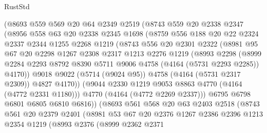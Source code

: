 \begin{lexlean}{RustStd}
\begin{coremodule}
          (@8693
            @559
            @569
            @20
            @64
            @2349
            @2519
            (@8743
              @559
              @20
              @2338
              @2347
              (@8956
                @558
                @63
                @20
                @2338
                @2345
                @1698
                (@8759
                  @556
                  @188
                  @20
                  @22
                  @2324
                  @2337
                  @2344
                  @1255
                  @2268
                  @1219
                  (@8743
                    @556
                    @20
                    @2301
                    @2322
                    (@8981
                      @95
                      @67
                      @20
                      @2298
                      @1267
                      @2308
                      @2317
                      @1213
                      @2276
                      @1219
                      (@8993
                        @2298
                        (@8999
                          @2284
                          @2293
                          @8792
                          @8390
                          @5711
                          @9006
                          @4758
                          (@4164 (@5731 @2293 @2285))
                          @4170))
                      @9018
                      @9022
                      (@5714 (@9024 @95))
                      @4758
                      (@4164 (@5731 @2317 @2309))
                      @4827
                      @4170))
                  (@9044 @2330 @1219 @9053 @8863 @4770 (@4164 (@4772 @2331 @1180)))
                  @4770
                  (@4164 (@4772 @2269 @2337)))
                @6795
                @6798
                @6801
                @6805
                @6810
                @6816))
            (@8693
              @561
              @568
              @20
              @63
              @2403
              @2518
              (@8743
                @561
                @20
                @2379
                @2401
                (@8981
                  @53
                  @67
                  @20
                  @2376
                  @1267
                  @2386
                  @2396
                  @1213
                  @2354
                  @1219
                  (@8993
                    @2376
                    (@8999
                      @2362
                      @2371

\end{coremodule}
\end{lexlean}
